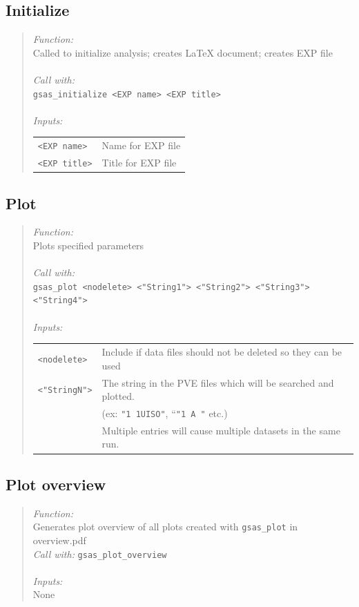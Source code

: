 \documentclass{article}
\begin{document}
\subsection{Initialize}
\begin{quote}
\textit{Function:} \\
Called to initialize analysis; creates LaTeX document; creates EXP file \\ \\
\textit{Call with:}\\
\texttt{gsas\_initialize <EXP name> <EXP title>} \\ \\
\textit{Inputs:}\\
\begin{tabular}[t]{l l}      
\texttt{<EXP name>} &   Name for EXP file  \\
\texttt{<EXP title>} & Title for EXP file \\
\end{tabular}
\end{quote}

\subsection{Plot}  
\begin{quote}
\textit{Function:}\\
Plots specified parameters \\ \\ 
\textit{Call with:} \\
\texttt{gsas\_plot <nodelete> <"String1"> <"String2"> <"String3">
<"String4">} \\ \\
\textit{Inputs:} \\
\begin{tabular}[t]{l l}
\texttt{<nodelete>} & Include if data files should not be deleted so they can be used \\
\texttt{<"StringN">} & The string in the PVE files which will be searched and plotted. \\
& (ex: \texttt{"1 1UISO"}, ``\texttt{"1 A    "} etc.) \\ 
& Multiple entries will cause multiple datasets in the same run. \\
\end{tabular}
\end{quote}

\subsection{Plot overview}
\begin{quote}
\textit{Function:} \\
Generates plot overview of all plots created with \texttt{gsas\_plot} in overview.pdf \\
\textit{Call with:}
\texttt{gsas\_plot\_overview} \\ \\   
\textit{Inputs:} \\
None \\
\end{quote}
\end{document}
